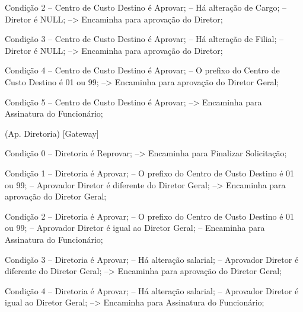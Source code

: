                      Condição 2
                        -- Centro de Custo Destino é Aprovar;
                        -- Há alteração de Cargo;
                        -- Diretor é NULL;
                           --> Encaminha para aprovação do Diretor;

                     Condição 3
                        -- Centro de Custo Destino é Aprovar;
                        -- Há alteração de Filial;
                        -- Diretor é NULL;
                           --> Encaminha para aprovação do Diretor;

                     Condição 4
                        -- Centro de Custo Destino é Aprovar;
                        -- O prefixo do Centro de Custo Destino é 01 ou 99;
                           --> Encaminha para aprovação do Diretor Geral;

                     Condição 5
                        -- Centro de Custo Destino é Aprovar;
                           --> Encaminha para Assinatura do Funcionário;

                     (Ap. Diretoria)
                        [Gateway]

                           Condição 0
                              -- Diretoria é Reprovar;
                                 --> Encaminha para Finalizar Solicitação;

                           Condição 1
                              -- Diretoria é Aprovar;
                              -- O prefixo do Centro de Custo Destino é 01 ou 99;
                              -- Aprovador Diretor é diferente do Diretor Geral;
                                 --> Encaminha para aprovação do Diretor Geral;

                           Condição 2
                              -- Diretoria é Aprovar;
                              -- O prefixo do Centro de Custo Destino é 01 ou 99;
                              -- Aprovador Diretor é igual ao Diretor Geral;
                                 -- Encaminha para Assinatura do Funcionário;

                           Condição 3
                              -- Diretoria é Aprovar;
                              -- Há alteração salarial;
                              -- Aprovador Diretor é diferente do Diretor Geral;
                                 --> Encaminha para aprovação do Diretor Geral;

                           Condição 4
                              -- Diretoria é Aprovar;
                              -- Há alteração salarial;
                              -- Aprovador Diretor é igual ao Diretor Geral;
                                 --> Encaminha para Assinatura do Funcionário;

